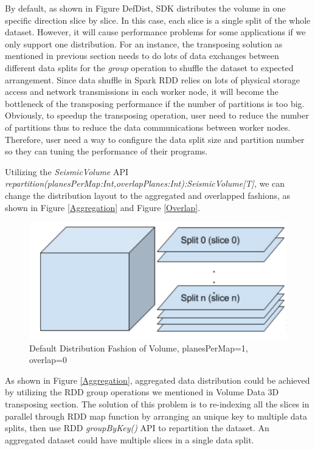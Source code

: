 By default, as shown in Figure {DefDist}, SDK distributes the volume in one specific direction slice by slice. In this case, each slice is a single split of the whole dataset. However, it will cause performance problems for some applications if we only support one distribution. For an instance, the transposing solution as mentioned in previous section needs to do lots of data exchanges between different data splits for the \emph{group} operation to shuffle the dataset to expected arrangement. Since data shuffle in Spark RDD relies on lots of physical storage access and network transmissions in each worker node, it will become the bottleneck of the transposing performance if the number of partitions is too big. Obviously, to speedup the transposing operation, user need to reduce the number of partitions thus to reduce the data communications between worker nodes. Therefore, user need a way to configure the data split size and partition number so they can tuning the performance of their programs.

Utilizing the \emph{SeismicVolume} API \emph{repartition(planesPerMap:Int,overlapPlanes:Int):SeismicVolume[T]}, we can change the distribution layout to the aggregated and overlapped fashions, as shown in Figure \ref{Aggregation} and Figure \ref{Overlap}.

\begin{figure}[h]
\centering
\includegraphics[scale=0.6]{figures/DefDist.png}
\caption{Default Distribution Fashion of Volume, planesPerMap=1, overlap=0}
\label{DefDist}
\end{figure}

As shown in Figure \ref{Aggregation}, aggregated data distribution could be achieved by utilizing the RDD group operations we mentioned in Volume Data 3D transposing section. The solution of this problem is to re-indexing all the slices in parallel through RDD map function by arranging an unique key to multiple data splits, then use RDD \emph{groupByKey()} API to repartition the dataset. An aggregated dataset could have multiple slices in a single data split.


